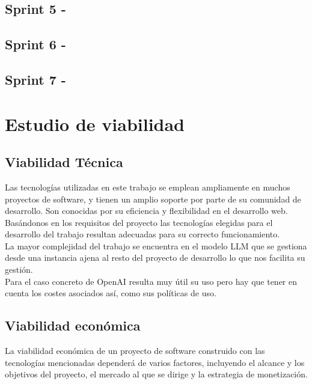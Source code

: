\subsection{Sprint 5 - }
\subsection{Sprint 6 - }
\subsection{Sprint 7 - }

\section{Estudio de viabilidad}

\subsection{Viabilidad Técnica}

Las tecnologías utilizadas en este trabajo se emplean ampliamente en muchos proyectos de software, y 
tienen un amplio soporte por parte de su comunidad de desarrollo. Son conocidas por su eficiencia y 
flexibilidad en el desarrollo web.\\
Basándonos en los requisitos del proyecto las tecnologías elegidas para el desarrollo del trabajo 
resultan adecuadas para su correcto funcionamiento.\\
La mayor complejidad del trabajo se encuentra en el modelo LLM que se gestiona desde una instancia ajena al 
resto del proyecto de desarrollo lo que nos facilita su gestión.\\
Para el caso concreto de OpenAI resulta muy útil su uso pero hay que tener en cuenta los costes asociados 
así, como sus políticas de uso.

\subsection{Viabilidad económica}
La viabilidad económica de un proyecto de software construido con las tecnologías 
mencionadas dependerá de varios factores, incluyendo el alcance y los objetivos del proyecto, 
el mercado al que se dirige y la estrategia de monetización.

